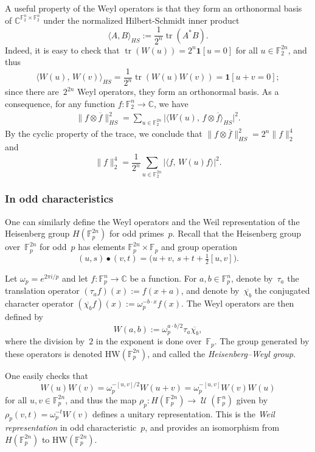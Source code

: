 \documentclass[11pt]{amsart}
\newcommand{\C}{\mathbb{C}} %
\newcommand{\F}{\mathbb{F}} %
\newcommand{\HW}{\mathrm{HW}}
\newcommand{\one}{\mathbf{1}}
\DeclareMathOperator{\U}{\mathcal{U}}
\DeclareMathOperator{\tr}{tr}
\theoremstyle{plain}
\theoremstyle{definition}
\theoremstyle{remark}
\begin{document}
A useful property of the Weyl operators is that they form an orthonormal basis of $\C^{\F_2^n \times \F_2^n}$ under the normalized Hilbert-Schmidt inner product
\begin{equation*}
    \langle A, B\rangle_{HS} := \frac{1}{2^n} \tr(A^*B).
\end{equation*}
Indeed, it is easy to check that $\tr(W(u)) = 2^n \one[u=0]$ for all $u\in \F_2^{2n}$, and thus
$$\big\langle W(u),\, W(v)\big\rangle_{HS} = \frac{1}{2^n} \tr(W(u)W(v)) = \one[u+v=0];$$
since there are~$2^{2n}$ Weyl operators, they form an orthonormal basis.
As a consequence, for any function $f: \F_2^n \to \C$, we have 
\begin{align*}
    \big\|f\otimes \overline{f}\big\|_{HS}^2 = \sum_{u\in \F_2^{2n}} \big|\big\langle W(u),\, f\otimes \overline{f}\big\rangle_{HS}\big|^2.
\end{align*}
By the cyclic property of the trace, we conclude that $\|f\otimes \overline{f}\|_{HS}^2 = 2^n \|f\|_2^4$ and
\begin{equation}\label{eq:WeylL2}
\|f\|_2^4 = \frac{1}{2^n} \sum_{u\in \F_2^{2n}} |\langle f,\, W(u) f\rangle|^2.    
\end{equation}


\subsubsection{In odd characteristics}
One can similarly define the Weyl operators and the Weil representation of the Heisenberg group $H(\F_p^{2n})$ for odd primes~$p$.
Recall that the Heisenberg group over~$\F_p^{2n}$ for odd~$p$ has elements $\F_p^{2n} \times \F_p$ and group operation
\begin{equation*} \label{eq:Heisenberg_odd}
    (u,s) \bullet (v,t) = \big(u+v,\, s+t+\tfrac{1}{2}[u,v]\big).
\end{equation*}

Let $\omega_p = e^{2\pi i/p}$ and let $f: \F_p^n \to \C$ be a function.
For $a, b \in \F_p^n$, denote by~$\tau_a$ the translation operator $(\tau_af)(x) := f(x+a)$, and denote by~$\overline{\chi_b}$ the conjugated character operator $(\overline{\chi_b} f)(x) := \omega_p^{-b\cdot x} f(x)$.
The Weyl operators are then defined by
$$W(a,b) := \omega_p^{a\cdot b/2} \tau_a \overline{\chi_b},$$
where the division by~$2$ in the exponent is done over~$\F_p$.
The group generated by these operators is denoted $\HW(\F_p^{2n})$, and called the \emph{Heisenberg--Weyl group}.

One easily checks that
$$W(u)W(v) = \omega_p^{-[u,v]/2} W(u+v) = \omega_p^{-[u,v]} W(v)W(u)$$
for all $u, v\in \F_p^{2n}$, and thus the map $\rho_p: H(\F_p^{2n}) \to \U(\F_p^n)$ given by $\rho_p(v,t) = \omega_p^{-t} W(v)$ defines a unitary representation.
This is the \emph{Weil representation} in odd characteristic~$p$, and provides an isomorphism from $H(\F_p^{2n})$ to $\HW(\F_p^{2n})$.
\end{document}
